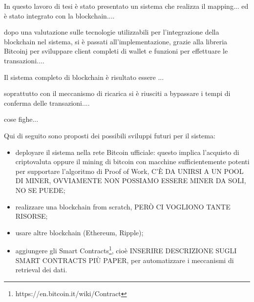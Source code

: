In questo lavoro di tesi è stato presentato un sistema che realizza il mapping... ed è stato integrato con la blockchain....

dopo una valutazione sulle tecnologie utilizzabili per l'integrazione della blockchain nel sistema, si è passati all'implementazione, grazie alla libreria Bitcoinj per sviluppare client completi di wallet e funzioni per effettuare le transazioni....

Il sistema completo di blockchain è risultato essere ...

soprattutto con il meccanismo di ricarica si è riusciti a bypassare i tempi di conferma delle transazioni....

cose fighe...


Qui di seguito sono proposti dei possibili sviluppi futuri per il sistema: 
\begin{itemize}
    \item deployare il sistema nella rete Bitcoin ufficiale: questo implica l'acquisto di criptovaluta oppure il mining di bitcoin con macchine sufficientemente potenti per supportare l'algoritmo di Proof of Work, C'È DA UNIRSI A UN POOL DI MINER, OVVIAMENTE NON POSSIAMO ESSERE MINER DA SOLI, NO SE PUEDE;
    \item realizzare una blockchain from scratch, PERÒ CI VOGLIONO TANTE RISORSE;
    \item usare altre blockchain (Ethereum, Ripple);
    \item aggiungere gli Smart Contracts\footnote{https://en.bitcoin.it/wiki/Contract}, cioè INSERIRE DESCRIZIONE SUGLI SMART CONTRACTS PIÙ PAPER, per automatizzare i meccanismi di retrieval dei dati.
\end{itemize}
